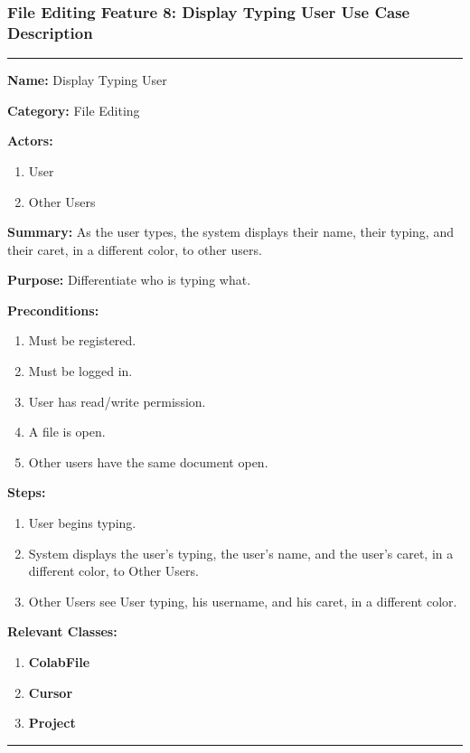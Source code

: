 \documentclass[twoside,letterpaper]{article}
\begin{document}
\newpage

\subsubsection[File Editing Feature 8: Display Typing User]{\rmfamily\bfseries\color{black}
	File Editing Feature 8: Display Typing User Use Case Description}
\hypertarget{RefHeading22059017292}{}

\vspace{2pt}
\hrule
\vspace{8pt}
	\noindent\textbf{Name:} Display Typing User \newline
	
	\noindent\textbf{Category:} File Editing \newline
	
	\noindent\textbf{Actors:} 
	\begin{enumerate}
		\item User
		\item Other Users
	\end{enumerate}
	\noindent\textbf{Summary:} As the user types, the system displays their name, their typing, and their caret, in a different color, to other users. \newline
	
	\noindent\textbf{Purpose:} Differentiate who is typing what. \newline
	
	\noindent\textbf{Preconditions:}
	\begin{enumerate}
		\item Must be registered.
		\item Must be logged in.
		\item User has read/write permission.
		\item A file is open.
		\item Other users have the same document open.
	\end{enumerate}
	\noindent\textbf{Steps:}
	\begin{enumerate}
		\item User begins typing.
		\item System displays the user's typing, the user's name, and the user's caret, in a different color, to Other Users.
		\item Other Users see User typing, his username, and his caret, in a different color.
	\end{enumerate}
	\noindent\textbf{Relevant Classes:}
	\begin{enumerate}
	   \item \textbf {ColabFile}
	   \item \textbf {Cursor}
	   \item \textbf {Project}
	\end{enumerate}
\vspace{8pt}
\hrule
\newpage
\end{document}
